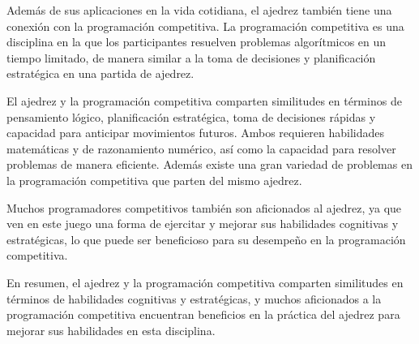 Además de sus aplicaciones en la vida cotidiana, el ajedrez también tiene una conexión con la programación competitiva. La programación competitiva es una disciplina en la que los participantes resuelven problemas algorítmicos en un tiempo limitado, de manera similar a la toma de decisiones y planificación estratégica en una partida de ajedrez.

El ajedrez y la programación competitiva comparten similitudes en términos de pensamiento lógico, planificación estratégica, toma de decisiones rápidas y capacidad para anticipar movimientos futuros. Ambos requieren habilidades matemáticas y de razonamiento numérico, así como la capacidad para resolver problemas de manera eficiente. Además existe una gran variedad de problemas en la programación competitiva que parten del mismo ajedrez. 

Muchos programadores competitivos también son aficionados al ajedrez, ya que ven en este juego una forma de ejercitar y mejorar sus habilidades cognitivas y estratégicas, lo que puede ser beneficioso para su desempeño en la programación competitiva.

En resumen, el ajedrez y la programación competitiva comparten similitudes en términos de habilidades cognitivas y estratégicas, y muchos aficionados a la programación competitiva encuentran beneficios en la práctica del ajedrez para mejorar sus habilidades en esta disciplina.